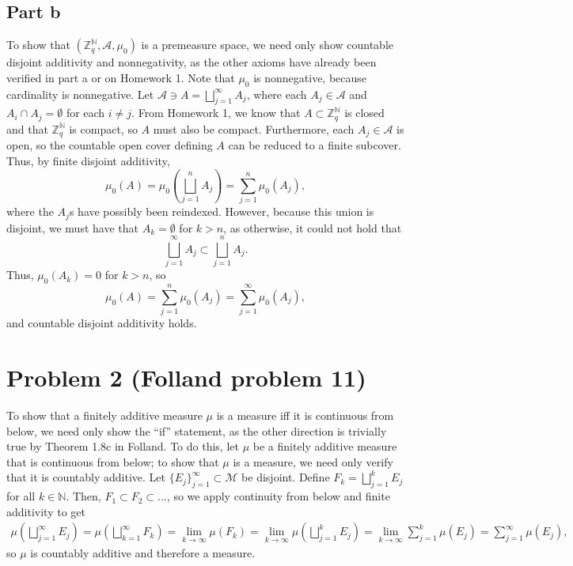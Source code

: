 \documentclass{article}
\begin{document}
\subsection{Part b}
To show that $(\mathbb{Z}^\mathbb{N}_q,\mathcal A,\mu_0)$ is a premeasure space, we need only show countable disjoint additivity and nonnegativity, as the other axioms have already been verified in part a or on Homework 1. Note that $\mu_0$ is nonnegative, because cardinality is nonnegative. Let $\mathcal A\ni A=\bigsqcup_{j=1}^\infty A_j$, where each $A_j\in\mathcal A$ and $A_i\cap A_j=\emptyset$ for each $i\neq j$. From Homework 1, we know that $A\subset \mathbb{Z}^\mathbb{N}_q$ is closed and that $\mathbb{Z}^\mathbb{N}_q$ is compact, so $A$ must also be compact. Furthermore, each $A_j\in\mathcal A$ is open, so the countable open cover defining $A$ can be reduced to a finite subcover. Thus, by finite disjoint additivity,
\[
\mu_0(A)=\mu_0\left(\bigsqcup_{j=1}^n A_j\right)=\sum_{j=1}^n\mu_0(A_j),
\]
where the $A_j$s have possibly been reindexed. However, because this union is disjoint, we must have that $A_k=\emptyset$ for $k>n$, as otherwise, it could not hold that 
\[
\bigsqcup_{j=1}^\infty A_j\subset \bigsqcup_{j=1}^n A_j.
\]
Thus, $\mu_0(A_k)=0$ for $k>n$, so
\[
\mu_0(A)=\sum_{j=1}^n\mu_0(A_j)=\sum_{j=1}^\infty\mu_0(A_j),
\]
and countable disjoint additivity holds.

\section{Problem 2 (Folland problem 11)}
To show that a finitely additive measure $\mu$ is a measure iff it is continuous from below, we need only show the ``if'' statement, as the other direction is trivially true by Theorem 1.8c in Folland. To do this, let $\mu$ be a finitely additive measure that is continuous from below; to show that $\mu$ is a measure, we need only verify that it is countably additive. Let $\{E_j\}_{j=1}^\infty\subset\mathcal M$ be disjoint. Define $F_k=\bigsqcup_{j=1}^kE_j$ for all $k\in\mathbb{N}$. Then, $F_1\subset F_2\subset\ldots$, so we apply continuity from below and finite additivity to get
\begin{align*}
\mu\left(\bigsqcup_{j=1}^\infty E_j\right)=\mu\left(\bigsqcup_{k=1}^\infty F_k\right)=\lim_{k\to\infty}\mu(F_k)=\lim_{k\to\infty}\mu\left(\bigsqcup_{j=1}^kE_j\right)=\lim_{k\to\infty}\sum_{j=1}^k\mu(E_j)=\sum_{j=1}^\infty\mu(E_j),
\end{align*}
so $\mu$ is countably additive and therefore a measure.
\end{document}
